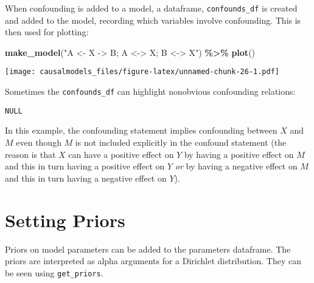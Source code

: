 \documentclass[
  12pt,
]{book}
\newenvironment{Shaded}{\begin{snugshade}}{\end{snugshade}}
\newcommand{\AttributeTok}[1]{\textcolor[rgb]{0.13,0.29,0.53}{#1}}
\newcommand{\FunctionTok}[1]{\textcolor[rgb]{0.13,0.29,0.53}{\textbf{#1}}}
\newcommand{\NormalTok}[1]{#1}
\newcommand{\OtherTok}[1]{\textcolor[rgb]{0.56,0.35,0.01}{#1}}
\newcommand{\SpecialCharTok}[1]{\textcolor[rgb]{0.81,0.36,0.00}{\textbf{#1}}}
\newcommand{\StringTok}[1]{\textcolor[rgb]{0.31,0.60,0.02}{#1}}
\begin{document}
When confounding is added to a model, a dataframe, \texttt{confounds\_df} is created and added to the model, recording which variables involve confounding. This is then used for plotting:

\begin{Shaded}
\begin{Highlighting}[]
\FunctionTok{make\_model}\NormalTok{(}\StringTok{"A \textless{}{-} X {-}\textgreater{} B; A \textless{}{-}\textgreater{} X; B \textless{}{-}\textgreater{} X"}\NormalTok{) }\SpecialCharTok{\%\textgreater{}\%} \FunctionTok{plot}\NormalTok{()}
\end{Highlighting}
\end{Shaded}

\texttt{[image: causalmodels\_files/figure-latex/unnamed-chunk-26-1.pdf]}

Sometimes the \texttt{confounds\_df} can highlight nonobvious confounding relations:

\begin{Shaded}
\end{Shaded}

\begin{verbatim}
NULL
\end{verbatim}

In this example, the confounding statement implies confounding between \(X\) and \(M\) even though \(M\) is not included explicitly in the confound statement (the reason is that \(X\) can have a positive effect on \(Y\) by having a positive effect on \(M\) and this in turn having a positive effect on \(Y\) \emph{or} by having a negative effect on \(M\) and this in turn having a negative effect on \(Y\)).

\hypertarget{priors}{%
\section{Setting Priors}\label{priors}}

Priors on model parameters can be added to the parameters dataframe. The priors are interpreted as alpha arguments for a Dirichlet distribution. They can be seen using \texttt{get\_priors}.
\end{document}

